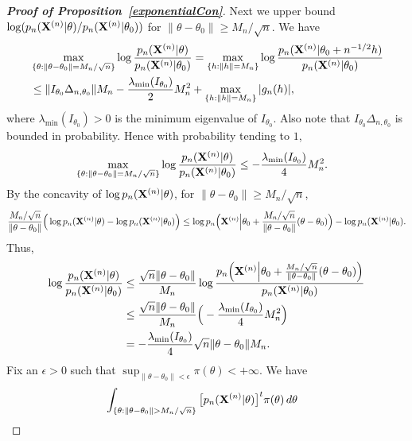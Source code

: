 \documentclass[11pt]{article}
\theoremstyle{plain}
\theoremstyle{definition}
\theoremstyle{remark}
\begin{document}
\begin{appendices}
\begin{proof}[\textbf{Proof of Proposition~\ref{exponentialCon}}]
Next we upper bound $\log (p_n(\BX^{(n)}|\theta)/p_n(\BX^{(n)}|\theta_0))$ for $\|\theta-\theta_0\|\geq M_n/\sqrt{n}$.
    We have
    $$
    \begin{aligned}
        &\max_{\{\theta:\|\theta-\theta_0\|=M_n/\sqrt{n}\}}
    \log\frac{p_n(\BX^{(n)}|\theta)}{p_n(\BX^{(n)}|\theta_0)}
    =
    \max_{\{h:\|h\|=M_n\}}
    \log\frac{p_n(\BX^{(n)}|\theta_0+n^{-1/2}h)}{p_n(\BX^{(n)}|\theta_0)}
        \\
        &\leq
         \|I_{\theta_0}\Delta_{n,\theta_0}\| M_n -\frac{\lambda_{\min}(I_{\theta_0})}{2} M_n^2+
        \max_{\{h:\|h\|=M_n\}}|g_n(h)|,
    \end{aligned}
    $$
    where $\lambda_{\min}(I_{\theta_0})>0$ is the minimum eigenvalue of $I_{\theta_0}$.
    Also note that $I_{\theta_0}\Delta_{n,\theta_0}$ is bounded in probability. Hence with probability tending to $1$,
    $$
    \begin{aligned}
        &\max_{\{\theta:\|\theta-\theta_0\|=M_n/\sqrt{n}\}}
    \log\frac{p_n(\BX^{(n)}|\theta)}{p_n(\BX^{(n)}|\theta_0)}
        \leq 
        -\frac{\lambda_{\min}(I_{\theta_0})}{4}M_n^2.
    \end{aligned} 
    $$
    By the concavity of $\log p_n(\BX^{(n)}|\theta)$, for $\|\theta-\theta_0\|\geq M_n/\sqrt{n}$,
    $$
     \frac{M_n/\sqrt{n}}{\|\theta-\theta_0\|}
     \Big(
     \log p_n(\BX^{(n)}|\theta)-\log p_n(\BX^{(n)}|\theta_0)
     \Big)
     \leq
     \log p_n \Big(\BX^{(n)}\Big|\theta_0+\frac{M_n/\sqrt{n}}{\|\theta-\theta_0\|}(\theta-\theta_0)\Big)-\log p_n(\BX^{(n)}|\theta_0).
    $$
    Thus,
    $$
    \begin{aligned}
     \log \frac{p_n(\BX^{(n)}|\theta)}{ p_n(\BX^{(n)}|\theta_0)}
        &\leq
        \frac{\sqrt{n}\|\theta-\theta_0\|}{M_n}
     \log \frac{p_n\Big(\BX^{(n)}\Big|\theta_0+\frac{M_n/\sqrt{n}}{\|\theta-\theta_0\|}(\theta-\theta_0)\Big)}{ p_n(\BX^{(n)}|\theta_0)}
        \\
        &\leq
        \frac{\sqrt{n}\|\theta-\theta_0\|}{M_n}
        \Big(-\frac{\lambda_{\min}(I_{\theta_0})}{4}M_n^2\Big)
        \\
        &=
        -\frac{\lambda_{\min}(I_{\theta_0})}{4}\sqrt{n}\|\theta-\theta_0\|
        M_n.
    \end{aligned}
    $$
    Fix an $\epsilon>0$ such that $\sup_{\|\theta-\theta_0\|< \epsilon}\pi(\theta) < +\infty $. We have
$$
    \begin{aligned}
        &\int_{\{\theta:\|\theta-\theta_0\|> M_n/\sqrt{n}\}} \big[p_n(\BX^{(n)}|\theta)\big]^t \pi(\theta)\, d\theta

\end{aligned}$$
\end{proof}
\end{appendices}
\end{document}
